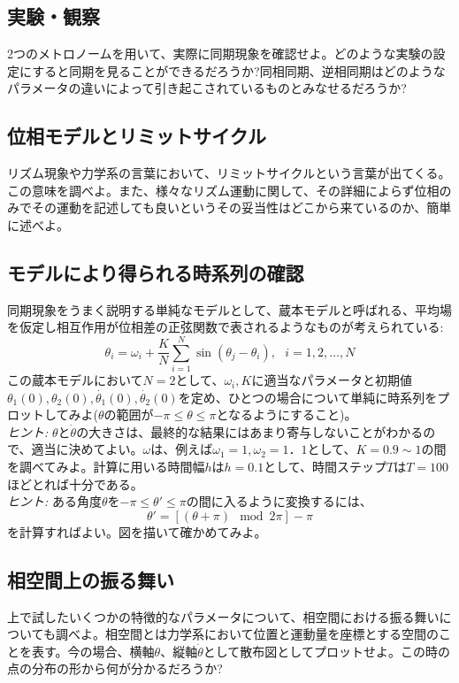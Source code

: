 \documentclass{jsarticle}
\begin{document}
\subsection{実験・観察}
    2つのメトロノームを用いて、実際に同期現象を確認せよ。どのような実験の設定にすると同期を見ることができるだろうか?同相同期、逆相同期はどのようなパラメータの違いによって引き起こされているものとみなせるだろうか?

\subsection{位相モデルとリミットサイクル}
    リズム現象や力学系の言葉において、リミットサイクルという言葉が出てくる。この意味を調べよ。また、様々なリズム運動に関して、その詳細によらず位相のみでその運動を記述しても良いというその妥当性はどこから来ているのか、簡単に述べよ。

\subsection{モデルにより得られる時系列の確認}
    同期現象をうまく説明する単純なモデルとして、蔵本モデルと呼ばれる、平均場を仮定し相互作用が位相差の正弦関数で表されるようなものが考えられている:
    $$\theta_{i} = \omega_{i} + \frac{K}{N}\sum_{i=1}^{N}\sin(\theta_{j}-\theta_{i}),\ \ \ i=1,2,\dots ,N$$
    この蔵本モデルにおいて$N=2$として、$\omega_{i},K$に適当なパラメータと初期値$\theta_{1}(0), \theta_{2}(0), \dot{\theta_{1}}(0), \dot{\theta_{2}}(0)$を定め、ひとつの場合について単純に時系列をプロットしてみよ($\theta$の範囲が$-\pi \le \theta \le \pi$となるようにすること)。\\
    \emph{ヒント:}  $\theta$と$\dot{\theta}$の大きさは、最終的な結果にはあまり寄与しないことがわかるので、適当に決めてよい。$\omega$は、例えば$\omega_{1} = 1, \omega_{2} = 1．1$として、$K=0.9\sim 1$の間を調べてみよ。計算に用いる時間幅$h$は$h=0.1$として、時間ステップ$T$は$T=100$ほどとれば十分である。\\
    \emph{ヒント:} ある角度$\theta$を$-\pi \le \theta' \le \pi$の間に入るように変換するには、
    $$\theta' = [(\theta + \pi)\mod 2\pi] - \pi$$
    を計算すればよい。図を描いて確かめてみよ。

\subsection{相空間上の振る舞い}
    上で試したいくつかの特徴的なパラメータについて、相空間における振る舞いについても調べよ。相空間とは力学系において位置と運動量を座標とする空間のことを表す。今の場合、横軸$\theta$、縦軸$\dot{\theta}$として散布図としてプロットせよ。この時の点の分布の形から何が分かるだろうか?
\end{document}
